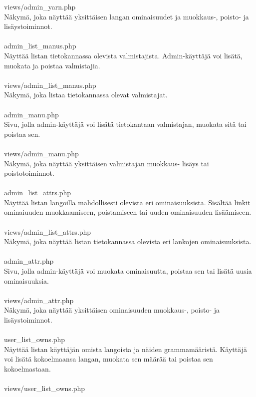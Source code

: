 \documentclass[12pt]{article}
\begin{document}
views/admin\_yarn.php\\
Näkymä, joka näyttää yksittäisen langan ominaisuudet ja muokkaus-, poisto- ja lisäystoiminnot.\\
\ \\
admin\_list\_manus.php\\
Näyttää listan tietokannassa olevista valmistajista. Admin-käyttäjä voi lisätä, muokata ja poistaa valmistajia.\\
\ \\
views/admin\_list\_manus.php\\
Näkymä, joka listaa tietokannassa olevat valmistajat.\\
\ \\
admin\_manu.php\\
Sivu, jolla admin-käyttäjä voi lisätä tietokantaan valmistajan, muokata sitä tai poistaa sen.\\
\ \\
views/admin\_manu.php\\
Näkymä, joka näyttää yksittäisen valmistajan muokkaus- lisäys tai poistotoiminnot.\\
\ \\
admin\_list\_attrs.php\\
Näyttää listan langoilla mahdollisesti olevista eri ominaisuuksista. Sisältää linkit ominaiuuden muokkaamiseen, poistamiseen tai uuden ominaisuuden lisäämiseen.\\
\ \\
views/admin\_list\_attrs.php\\
Näkymä, joka näyttää listan tietokannassa olevista eri lankojen ominaisuuksista.\\
\ \\
admin\_attr.php\\
Sivu, jolla admin-käyttäjä voi muokata ominaisuutta, poistaa sen tai lisätä uusia ominaisuuksia.\\
\ \\
views/admin\_attr.php\\
Näkymä, joka näyttää yksittäisen ominaisuuden muokkaus-, poisto- ja lisäystoiminnot.\\
\ \\
user\_list\_owns.php\\
Näyttää listan käyttäjän omista langoista ja näiden grammamääristä. Käyttäjä voi lisätä kokoelmaansa langan, muokata sen määrää tai poistaa sen kokoelmastaan.\\
\ \\
views/user\_list\_owns.php\\
\end{document}
